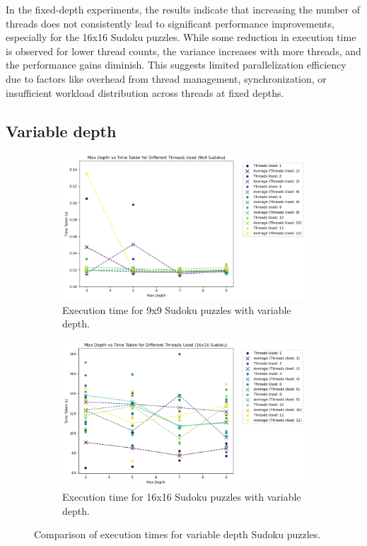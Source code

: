 \documentclass[a4paper,11pt]{article}
\begin{document}
In the fixed-depth experiments, the results indicate that increasing the number of threads does not consistently lead to significant performance improvements, especially for the 16x16 Sudoku puzzles. While some reduction in execution time is observed for lower thread counts, the variance increases with more threads, and the performance gains diminish. This suggests limited parallelization efficiency due to factors like overhead from thread management, synchronization, or insufficient workload distribution across threads at fixed depths.

\subsection{Variable depth}

\begin{figure}[H]
    \centering
    \begin{subfigure}[b]{0.45\textwidth}
        \centering
        \includegraphics[width=\textwidth]{9x9_var_depth.png}
        \caption{Execution time for 9x9 Sudoku puzzles with variable depth.}
    \end{subfigure}
    \hfill
    \begin{subfigure}[b]{0.45\textwidth}
        \centering
        \includegraphics[width=\textwidth]{16x16_var_depth.png}
        \caption{Execution time for 16x16 Sudoku puzzles with variable depth.}
    \end{subfigure}
    \caption{Comparison of execution times for variable depth Sudoku puzzles.}
\end{figure}
\end{document}
